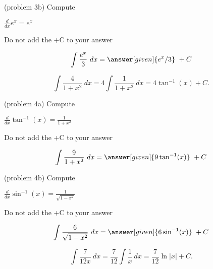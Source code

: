 \documentclass{ximera}
\begin{document}
\begin{problem}(problem 3b)
Compute

\begin{hint}
$\frac{d}{dx} e^x = e^x$
\end{hint}
\begin{hint}
\begin{center}
Do not add the +C to your answer
\end{center}
\end{hint}

\[
\int \frac{e^x}{3} \ dx =
\answer[given]{e^x /3} \ +  C
\]
\end{problem}


\begin{example}[example 4]
\[
\int \frac{4}{1+x^2} \ dx = 4 \int \frac{1}{1+x^2} \ dx = 4\tan^{-1}(x) +C.
\]
\end{example}



\begin{problem}(problem 4a)
Compute

\begin{hint}
$\frac{d}{dx} \tan^{-1}(x) = \frac{1}{1+x^2}$
\end{hint}
\begin{hint}
\begin{center}
Do not add the +C to your answer
\end{center}
\end{hint}

\[
\int \frac{9}{1+x^2} \ dx =
\answer[given]{9\tan^{-1}(x)} \ +  C
\]
\end{problem}

\begin{problem}(problem 4b)
Compute

\begin{hint}
$\frac{d}{dx} \sin^{-1}(x) = \frac{1}{\sqrt{1-x^2}}$
\end{hint}
\begin{hint}
\begin{center}
Do not add the +C to your answer
\end{center}
\end{hint}

\[
\int \frac{6}{\sqrt{1-x^2}} \ dx =
\answer[given]{6\sin^{-1}(x)} \ +  C
\]
\end{problem}


\begin{example}[example 5]
\[
\int \frac{7}{12x} \ dx = \frac{7}{12} \int \frac{1}{x} \ dx = \frac{7}{12} \ln|x| +C.
\]
\end{example}
\end{document}

